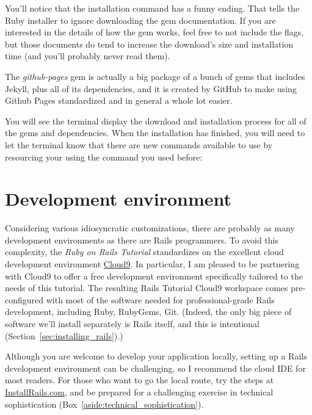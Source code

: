 You'll notice that the installation command has a funny ending. That  tells the Ruby installer to ignore downloading the gem documentation. If you are interested in the details of how the gem works, feel free to not include the flags, but those documents do tend to increase the download's size and installation time (and you'll probably never read them).

The \emph{github-pages} gem is actually a big package of a bunch of gems that includes Jekyll, plus all of its dependencies, and it is created by GitHub to make using Github Pages standardized and in general a whole lot easier.

You will see the terminal display the download and installation process for all of the gems and dependencies. When the installation has finished, you will need to let the terminal know that there are new commands available to use by resourcing your  using the command you used before:





    \section{Development environment}
    \label{sec:development_environment}

Considering various idiosyncratic customizations, there are probably as many development environments as there are Rails programmers. To avoid this complexity, the \emph{Ruby on Rails Tutorial} standardizes on the excellent cloud development environment \href{http://c9.io/}{Cloud9}. In particular, I am pleased to be partnering with Cloud9 to offer a free development environment specifically tailored to the needs of this tutorial. The resulting Rails Tutorial Cloud9 workspace comes pre-configured with most of the software needed for professional-grade Rails development, including Ruby, RubyGems, Git. (Indeed, the only big piece of software we'll install separately is Rails itself, and this is intentional (Section~\ref{sec:installing_rails}).)

Although you are welcome to develop your application locally, setting up a Rails development environment can be challenging, so I recommend the cloud IDE for most readers. For those who want to go the local route, try the steps at \href{http://installrails.com/}{InstallRails.com}, and be prepared for a challenging exercise in technical sophistication (Box~\ref{aside:technical_sophistication}).


